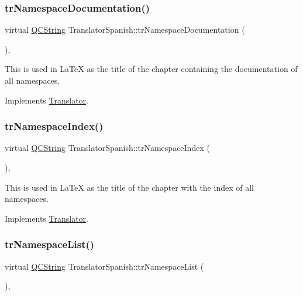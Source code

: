 \subsubsection{\texorpdfstring{trNamespaceDocumentation()}{trNamespaceDocumentation()}}
{\footnotesize\ttfamily virtual \mbox{\hyperlink{class_q_c_string}{Q\+C\+String}} Translator\+Spanish\+::tr\+Namespace\+Documentation (\begin{DoxyParamCaption}{ }\end{DoxyParamCaption})\hspace{0.3cm}{\ttfamily [inline]}, {\ttfamily [virtual]}}

This is used in La\+TeX as the title of the chapter containing the documentation of all namespaces. 

Implements \mbox{\hyperlink{class_translator}{Translator}}.

\mbox{\label{class_translator_spanish_ac116063f05b51640ee76897c68690a79}} 
\subsubsection{\texorpdfstring{trNamespaceIndex()}{trNamespaceIndex()}}
{\footnotesize\ttfamily virtual \mbox{\hyperlink{class_q_c_string}{Q\+C\+String}} Translator\+Spanish\+::tr\+Namespace\+Index (\begin{DoxyParamCaption}{ }\end{DoxyParamCaption})\hspace{0.3cm}{\ttfamily [inline]}, {\ttfamily [virtual]}}

This is used in La\+TeX as the title of the chapter with the index of all namespaces. 

Implements \mbox{\hyperlink{class_translator}{Translator}}.

\mbox{\label{class_translator_spanish_a27c210d96bb4cbf7d37f6bb4101fd08b}} 
\subsubsection{\texorpdfstring{trNamespaceList()}{trNamespaceList()}}
{\footnotesize\ttfamily virtual \mbox{\hyperlink{class_q_c_string}{Q\+C\+String}} Translator\+Spanish\+::tr\+Namespace\+List (\begin{DoxyParamCaption}{ }\end{DoxyParamCaption})\hspace{0.3cm}{\ttfamily [inline]}, {\ttfamily [virtual]}}

